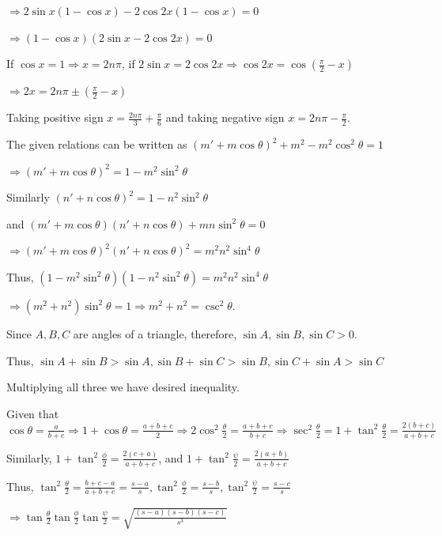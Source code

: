   $\Rightarrow 2\sin x(1 - \cos x) - 2\cos2x(1 - \cos x) = 0$

  $\Rightarrow (1 - \cos x)(2\sin x - 2\cos2x) = 0$

  If $\cos x = 1 \Rightarrow x = 2n\pi$, if $2\sin x = 2\cos2x \Rightarrow \cos2x = \cos\left(\frac{\pi}{2}
  - x\right)$

  $\Rightarrow 2x = 2n\pi \pm \left(\frac{\pi}{2} - x\right)$

  Taking positive sign $x = \frac{2n\pi}{3} + \frac{\pi}{6}$ and taking negative sign $x = 2n\pi
  - \frac{\pi}{2}$.
\item The given relations can be written as $\left(m' + m\cos\theta\right)^2 + m^2 - m^2\cos^2\theta = 1$

  $\Rightarrow \left(m' + m\cos\theta\right)^2 = 1 - m^2\sin^2\theta$

  Similarly $\left(n' + n\cos\theta\right)^2 = 1 - n^2\sin^2\theta$

  and $\left(m' + m\cos\theta\right)\left(n' + n\cos\theta\right) + mn\sin^2\theta = 0$

  $\Rightarrow \left(m' + m\cos\theta\right)^2\left(n' + n\cos\theta\right)^2 = m^2n^2\sin^4\theta$

  Thus, $\left(1 - m^2\sin^2\theta\right)\left(1 - n^2\sin^2\theta\right) = m^2n^2\sin^4\theta$

  $\Rightarrow \left(m^2 + n^2\right)\sin^2\theta = 1 \Rightarrow m^2 + n^2 = \csc^2\theta$.
\item Since $A, B, C$ are angles of a triangle, therefore, $\sin A, \sin B, \sin C > 0$.

  Thus, $\sin A + \sin B > \sin A, \sin B + \sin C > \sin B, \sin C + \sin A > \sin C$

  Multiplying all three we have desired inequality.
\item Given that $\cos\theta = \frac{a}{b + c}\Rightarrow 1 + \cos\theta = \frac{a + b + c}{2}\Rightarrow
  2\cos^2\frac{\theta}{2} = \frac{a + b + c}{b + c}\Rightarrow \sec^2\frac{\theta}{2} = 1
  + \tan^2\frac{\theta}{2} = \frac{2(b + c)}{a + b + c}$

  Similarly, $1 + \tan^2\frac{\phi}{2} = \frac{2(c + a)}{a + b + c}$, and $1 + \tan^2\frac{\psi}{2}
  = \frac{2(a + b)}{a + b + c}$

  Thus, $\tan^2\frac{\theta}{2} = \frac{b + c - a}{a + b + c} = \frac{s - a}{s}, \tan^2\frac{\phi}{2}
  = \frac{s - b}{s}, \tan^2\frac{\psi}{2} = \frac{s - c}{s}$

  $\Rightarrow \tan\frac{\theta}{2}\tan\frac{\phi}{2}\tan\frac{\psi}{2} = \sqrt{\frac{(s - a)(s - b)(s -
      c)}{s^3}}$

